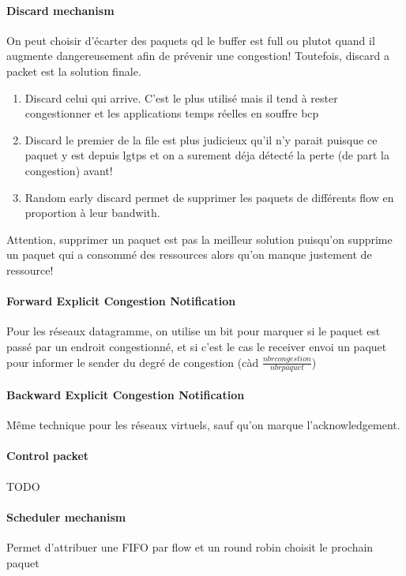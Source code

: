 \paragraph{Discard mechanism}
On peut choisir d'écarter des paquets qd le buffer est full ou plutot quand il
augmente dangereusement afin de prévenir une congestion!
Toutefois, discard a packet est la solution finale.

\begin{enumerate}
    \item Discard celui qui arrive. C'est le plus utilisé mais il tend à rester congestionner et
        les applications temps réelles en souffre bcp
    \item Discard le premier de la file est plus judicieux qu'il n'y parait puisque ce paquet
        y est depuis lgtps et on a surement déja détecté la perte (de part la congestion) avant!
    \item Random early discard permet de supprimer les paquets de différents flow en proportion
        à leur bandwith.
\end{enumerate}

Attention, supprimer un paquet est pas la meilleur solution puisqu'on supprime un paquet
qui a consommé des ressources alors qu'on manque justement de ressource!

\paragraph{Forward Explicit Congestion Notification}
Pour les réseaux datagramme,
on utilise un bit pour marquer si le paquet est passé par un endroit congestionné,
et si c'est le cas le receiver envoi un paquet pour informer le sender du degré
de congestion (càd $\frac{nbr congestion}{nbr paquet}$)

\paragraph{Backward Explicit Congestion Notification}
Même technique pour les réseaux virtuels, sauf qu'on marque l'acknowledgement.

\paragraph{Control packet}
TODO

\paragraph{Scheduler mechanism}
Permet d'attribuer une FIFO par flow et un round robin choisit le prochain paquet


